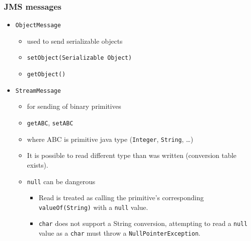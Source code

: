 \documentclass[10pt,xcolor=pdflatex]{beamer}
\begin{document}
\begin{frame}[containsverbatim]\frametitle{JMS messages}
\begin{itemize}
	\item \texttt{ObjectMessage}
	  \begin{itemize}
		\item used to send serializable objects
		\item \texttt{setObject(Serializable Object)}
		\item \texttt{getObject()}
	  \end{itemize}
    \item \texttt{StreamMessage}
	  \begin{itemize}
		\item for sending of binary primitives
		\item \texttt{getABC}, \texttt{setABC}
        \item where ABC is primitive java type (\texttt{Integer}, \texttt{String}, \ldots)
        \item It is possible to read different type than was written (conversion table exists).
        \item \texttt{null} can be dangerous
          \begin{itemize}
              \item Read is treated as calling the primitive's corresponding \texttt{valueOf(String)} with a \texttt{null} value.
              \item \texttt{char} does not support a String conversion, attempting to read a \texttt{null} value as a \texttt{char} must throw a \texttt{NullPointerException}.
          \end{itemize}
	  \end{itemize}
\end{itemize}
\end{frame}
\end{document}
